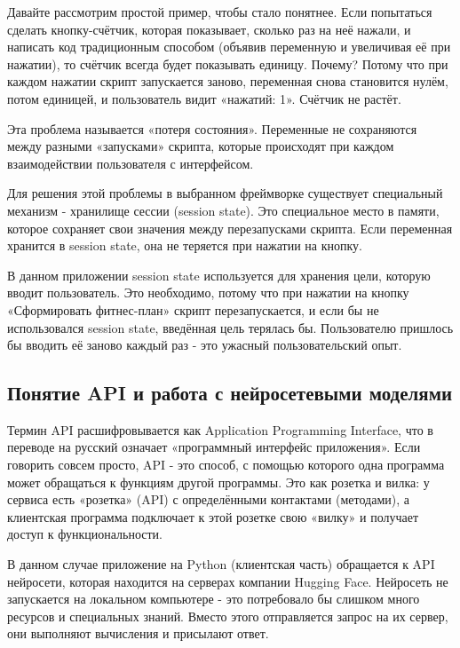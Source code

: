 \documentclass[14pt, a4paper]{extarticle}
\begin{document}
\begin{enumerate}
\medskip
\noindent Давайте рассмотрим простой пример, чтобы стало понятнее. Если попытаться сделать кнопку-счётчик, которая показывает, сколько раз на неё нажали, и написать код традиционным способом (объявив переменную и увеличивая её при нажатии), то счётчик всегда будет показывать единицу. Почему? Потому что при каждом нажатии скрипт запускается заново, переменная снова становится нулём, потом единицей, и пользователь видит «нажатий: 1». Счётчик не растёт.

\medskip
\noindent Эта проблема называется «потеря состояния». Переменные не сохраняются между разными «запусками» скрипта, которые происходят при каждом взаимодействии пользователя с интерфейсом.

\medskip
\noindent Для решения этой проблемы в выбранном фреймворке существует специальный механизм - хранилище сессии (session state). Это специальное место в памяти, которое сохраняет свои значения между перезапусками скрипта. Если переменная хранится в session state, она не теряется при нажатии на кнопку.

\medskip
\noindent В данном приложении session state используется для хранения цели, которую вводит пользователь. Это необходимо, потому что при нажатии на кнопку «Сформировать фитнес-план» скрипт перезапускается, и если бы не использовался session state, введённая цель терялась бы. Пользователю пришлось бы вводить её заново каждый раз - это ужасный пользовательский опыт.

\subsection{Понятие API и работа с нейросетевыми моделями}

\noindent Термин API расшифровывается как Application Programming Interface, что в переводе на русский означает «программный интерфейс приложения». Если говорить совсем просто, API - это способ, с помощью которого одна программа может обращаться к функциям другой программы. Это как розетка и вилка: у сервиса есть «розетка» (API) с определёнными контактами (методами), а клиентская программа подключает к этой розетке свою «вилку» и получает доступ к функциональности.

\medskip
\noindent В данном случае приложение на Python (клиентская часть) обращается к API нейросети, которая находится на серверах компании Hugging Face. Нейросеть не запускается на локальном компьютере - это потребовало бы слишком много ресурсов и специальных знаний. Вместо этого отправляется запрос на их сервер, они выполняют вычисления и присылают ответ.


\end{enumerate}
\end{document}
